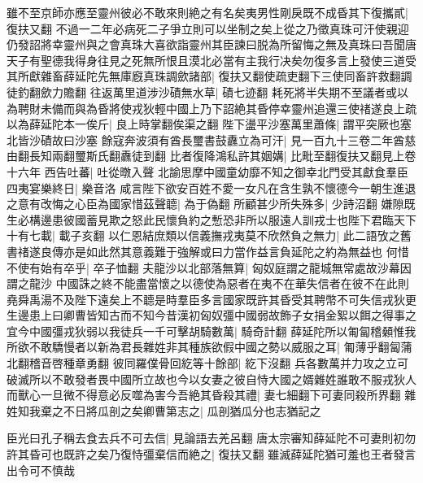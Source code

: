 雖不至京師亦應至靈州彼必不敢來則絶之有名矣夷男性剛戾既不成昏其下復攜貳|{
	復扶又翻}
不過一二年必病死二子爭立則可以坐制之矣上從之乃徵真珠可汗使親迎仍發詔將幸靈州與之會真珠大喜欲詣靈州其臣諫曰脱為所留悔之無及真珠曰吾聞唐天子有聖德我得身往見之死無所恨且漠北必當有主我行决矣勿復多言上發使三道受其所獻雜畜薛延陀先無庫廐真珠調歛諸部|{
	復扶又翻使疏吏翻下三使同畜許救翻調徒釣翻歛力贍翻}
往返萬里道涉沙磧無水草|{
	磧七迹翻}
耗死將半失期不至議者或以為聘財未備而與為昏將使戎狄輕中國上乃下詔絶其昏停幸靈州追還三使禇遂良上疏以為薛延陀本一俟斤|{
	良上時掌翻俟渠之翻}
陛下盪平沙塞萬里蕭條|{
	謂平突厥也塞北皆沙磧故曰沙塞}
餘寇奔波須有酋長璽書鼓纛立為可汗|{
	見一百九十三卷二年酋慈由翻長知兩翻璽斯氏翻纛徒到翻}
比者復降鴻私許其姻媾|{
	比毗至翻復扶又翻見上卷十六年}
西告吐蕃|{
	吐從暾入聲}
北諭思摩中國童幼靡不知之御幸北門受其獻食羣臣四夷宴樂終日|{
	樂音洛}
咸言陛下欲安百姓不愛一女凡在含生孰不懷德今一朝生進退之意有改悔之心臣為國家惜茲聲聼|{
	為于偽翻}
所顧甚少所失殊多|{
	少詩沼翻}
嫌隙既生必構邊患彼國蓄見欺之怒此民懷負約之慙恐非所以服遠人訓戎士也陛下君臨天下十有七載|{
	載子亥翻}
以仁恩結庶類以信義撫戎夷莫不欣然負之無力|{
	此二語攷之舊書禇遂良傳亦是如此然其意義難于強解或曰力當作益言負延陀之約為無益也}
何惜不使有始有卒乎|{
	卒子恤翻}
夫龍沙以北部落無算|{
	匈奴庭謂之龍城無常處故沙幕因謂之龍沙}
中國誅之終不能盡當懷之以德使為惡者在夷不在華失信者在彼不在此則堯舜禹湯不及陛下遠矣上不聼是時羣臣多言國家既許其昏受其聘幣不可失信戎狄更生邊患上曰卿曹皆知古而不知今昔漢初匈奴彊中國弱故飾子女捐金絮以餌之得事之宜今中國彊戎狄弱以我徒兵一千可擊胡騎數萬|{
	騎奇計翻}
薛延陀所以匍匐稽顙惟我所欲不敢驕慢者以新為君長雜姓非其種族欲假中國之勢以威服之耳|{
	匍薄乎翻匐蒲北翻稽音啓種章勇翻}
彼同羅僕骨回紇等十餘部|{
	紇下沒翻}
兵各數萬并力攻之立可破滅所以不敢發者畏中國所立故也今以女妻之彼自恃大國之婿雜姓誰敢不服戎狄人而獸心一旦微不得意必反噬為害今吾絶其昏殺其禮|{
	妻七細翻下可妻同殺所界翻}
雜姓知我棄之不日將瓜剖之矣卿曹第志之|{
	瓜剖猶瓜分也志猶記之}


臣光曰孔子稱去食去兵不可去信|{
	見論語去羌呂翻}
唐太宗審知薛延陀不可妻則初勿許其昏可也既許之矣乃復恃彊棄信而絶之|{
	復扶又翻}
雖滅薛延陀猶可羞也王者發言出令可不慎哉

